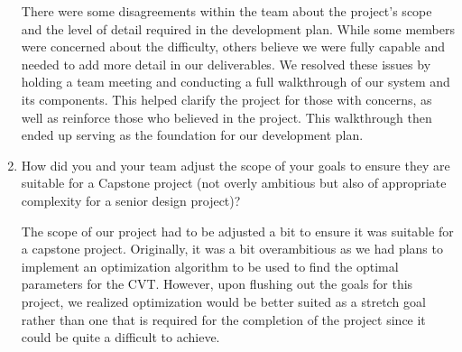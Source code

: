 \documentclass{article}
\begin{document}
\begin{enumerate}
    There were some disagreements within the team about the project's scope and the level of detail required in the development plan.
    While some members were concerned about the difficulty, others believe we were fully capable and needed to add more detail in our deliverables.
    We resolved these issues by holding a team meeting and conducting a full walkthrough of our system and its components. This helped clarify the project
    for those with concerns, as well as reinforce those who believed in the project. This walkthrough then ended up serving as the foundation for our 
    development plan.
    
    \item How did you and your team adjust the scope of your goals to ensure
    they are suitable for a Capstone project (not overly ambitious but also of
    appropriate complexity for a senior design project)?

    The scope of our project had to be adjusted a bit to ensure it was suitable
    for a capstone project. Originally, it was a bit overambitious as we
    had plans to implement an optimization algorithm to be used to find the
    optimal parameters for the CVT. However, upon flushing out the goals for
    this project, we realized optimization would be better suited as a
    stretch goal rather than one that is required for the completion of the project
    since it could be quite a difficult to achieve.
    \end{enumerate}  
\end{document}
